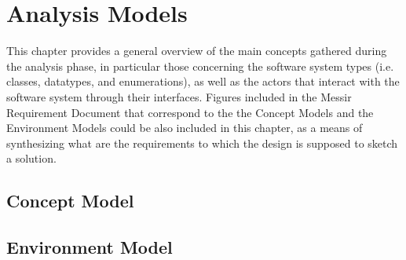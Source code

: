 \chapter{Analysis Models}
\label{chap:AM}

This chapter provides a general overview of the main concepts gathered during
the analysis phase, in particular those concerning the software system types
(i.e. classes, datatypes, and enumerations), as well as the actors that interact
with the software system through their interfaces. Figures included in the
Messir Requirement Document that correspond to the  the \glspl{Concept Model} and the \glspl{Environment
Model} could be also included in this chapter, as a means of synthesizing what
are the requirements to which the design is supposed to sketch a solution.




\section{Concept Model}
 



   

\section{Environment Model}
